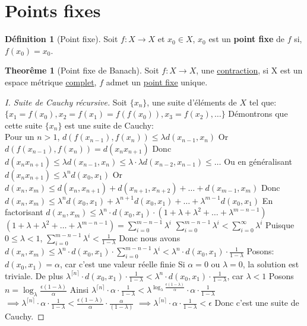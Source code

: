 \documentclass[12pt]{book}
\def\sep{\phantom{}}
\theoremstyle{definition}
\newtheorem{definition}{Définition}[section]
\newtheorem{theorem}{Theorême}[section]
\begin{document}
\section{Points fixes}

\begin{definition}[Point fixe]
    \label{def:point_fixe}
    Soit $f: X \to X$ et $x_0 \in X$, $x_0$ est un \textbf{point fixe} de $f$ si, $f(x_0) = x_0$.
\end{definition}

\begin{theorem}[Point fixe de Banach]
    \label{thm:point_fixe_banach}
    Soit $f: X \to X$, une \hyperref[def:contraction]{contraction}, si X est un espace métrique \hyperref[def:completude]{complet},
    $f$ admet un \hyperref[def:point_fixe]{point fixe} unique.
\end{theorem}

\begin{proof}[I. Suite de Cauchy récursive]
    Soit $\{x_n\}$, une suite d'éléments de $X$ tel que: $\{x_1 = f(x_0), x_2 = f(x_1) = f(f(x_0)), x_3 = f(x_2), \dots \}$ \sep
    Démontrons que cette suite $\{x_n\}$ est une suite de Cauchy: \sep \\
    Pour un $n > 1$, $d(f(x_{n-1}), f(x_n)) \leq \lambda d(x_{n-1}, x_n)$ \sep
    Or $d(f(x_{n-1}), f(x_n)) = d(x_n x_{n+1})$ \sep 
    Donc $d(x_n x_{n+1}) \leq \lambda d(x_{n-1}, x_n) \leq \lambda \cdot \lambda d(x_{n-2}, x_{n-1}) \leq \dots $ \sep
    Ou en généralisant $d(x_n x_{n+1}) \leq \lambda^n d(x_0, x_1)$ \sep 
    Or $d(x_n, x_m) \leq d(x_n, x_{n+1}) + d(x_{n+1}, x_{n+2}) + \dots + d(x_{m-1}, x_m)$ \sep 
    Donc $d(x_n, x_m) \leq  \lambda^n d(x_0, x_1) + \lambda^{n+1} d(x_0, x_1) + \dots + \lambda^{m-1} d(x_0, x_1)$ \sep
    En factorisant $d(x_n, x_m) \leq \lambda^n \cdot d(x_0, x_1) \cdot (1 + \lambda + \lambda^2 + \dots + \lambda^{m-n-1})$ \sep 
    $(1 + \lambda + \lambda^2 + \dots + \lambda^{m-n-1}) = \sum_{i=0}^{m-n-1} \lambda^i$  \sep 
    $\sum_{i=0}^{m-n-1} \lambda^i < \sum_{i=0}^{\infty} \lambda^i$ \sep 
    Puisque $0 \leq \lambda < 1$, $\sum_{i=0}^{m-n-1} \lambda^i < \frac{1}{1-\lambda}$ \sep
    Donc nous avons $d(x_n, x_m) \leq \lambda^n \cdot d(x_0, x_1) \cdot \sum_{i=0}^{m-n-1} \lambda^i <  \lambda^n \cdot d(x_0, x_1) \cdot \frac{1}{1-\lambda} $ \sep
    Posons: $d(x_0, x_1) = \alpha$, car c'est une valeur réelle finie \sep 
    Si $\alpha = 0$ ou $\lambda = 0$, la solution est triviale. \sep 
    De plus $\lambda^{\lceil n \rceil} \cdot d(x_0, x_1) \cdot \frac{1}{1-\lambda} < \lambda^{n} \cdot d(x_0, x_1) \cdot \frac{1}{1-\lambda}$, car $\lambda < 1$ \sep
    Posons $n = \log_{\lambda}\frac{\epsilon(1 - \lambda)}{\alpha}$ \sep 
    Ainsi $\lambda^{\lceil n \rceil} \cdot \alpha \cdot \frac{1}{1-\lambda} < \lambda^{\log_{\lambda}\frac{\epsilon(1 - \lambda)}{\alpha}} \cdot \alpha \cdot \frac{1}{1-\lambda}$ \sep
    $\implies \lambda^{\lceil n \rceil} \cdot \alpha \cdot \frac{1}{1-\lambda} < \frac{\epsilon(1 - \lambda)}{\alpha} \cdot \frac{\alpha}{(1 - \lambda)}$ \sep 
    $\implies \lambda^{\lceil n \rceil} \cdot \alpha \cdot \frac{1}{1-\lambda} < \epsilon$ \sep
    Donc c'est une suite de Cauchy.
\end{proof}
\end{document}
